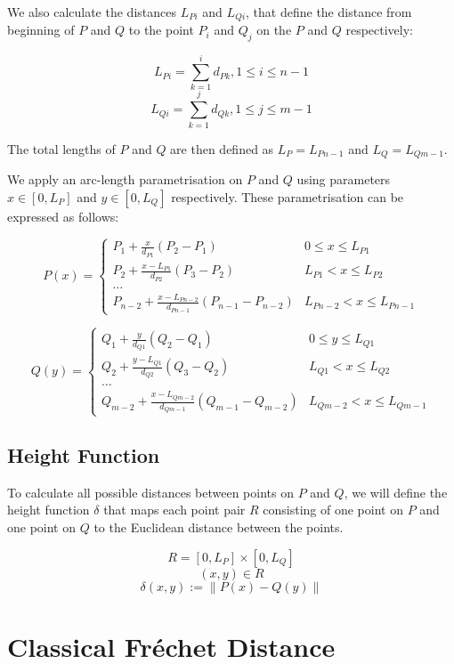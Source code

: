 We also calculate the distances $L_{Pi}$ and $L_{Qi}$, that define the distance from beginning of $P$ and $Q$ to the point $P_i$ and $Q_j$ on the $P$ and $Q$ respectively:

$$L_{Pi} = \sum\limits_{k=1}^{i} {d_{Pk}}, 1 \leq i \leq n-1$$
$$L_{Qi} = \sum\limits_{k=1}^{j} {d_{Qk}}, 1 \leq j \leq m-1$$

The total lengths of $P$ and $Q$ are then defined as $L_P = L_{Pn-1}$ and $L_Q = L_{Qm-1}$.

We apply an arc-length parametrisation on $P$ and $Q$ using parameters $x \in [0, L_P]$ and $y \in [0, L_Q]$ respectively. These parametrisation can be expressed as follows:

\[ P(x) =
\begin{cases} 
	P_1 + \frac{x}{d_{P1}}(P_2-P_1) & 0 \leq x \leq L_{P1} \\
	P_2 + \frac{x-L_{P1}}{d_{P2}}(P_3-P_2) & L_{P1} < x \leq L_{P2} \\
	\dots \\
	P_{n-2} + \frac{x-L_{Pn-2}}{d_{Pn-1}}(P_{n-1}-P_{n-2}) & L_{Pn-2} < x \leq L_{Pn-1}
\end{cases}
\]

\[ Q(y) =
\begin{cases} 
	Q_1 + \frac{y}{d_{Q1}}(Q_2-Q_1) & 0 \leq y \leq L_{Q1} \\
	Q_2 + \frac{y-L_{Q1}}{d_{Q2}}(Q_3-Q_2) & L_{Q1} < x \leq L_{Q2} \\
	\dots \\
	Q_{m-2} + \frac{x-L_{Qm-2}}{d_{Qm-1}}(Q_{m-1}-Q_{m-2}) & L_{Qm-2} < x \leq L_{Qm-1}
\end{cases}
\]

\subsection{Height Function} \label{heightfunc}

To calculate all possible distances between points on $P$ and $Q$, we will define the height function $\delta$ that maps each point pair $R$ consisting of one point on $P$ and one point on $Q$ to the Euclidean distance between the points.

$$R = [0, L_P ] \times [0, L_Q]$$
$$(x, y) \in R$$
$$\delta(x, y) := \left\| P(x) - Q(y) \right\|$$

\section{Classical Fréchet Distance}

